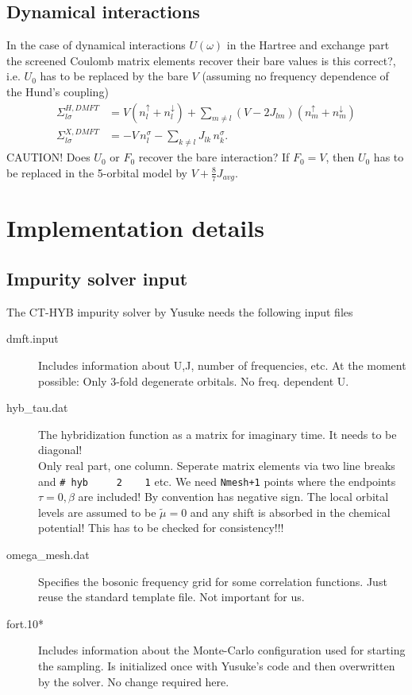 \documentclass[12pt,a4paper]{scrartcl}
\numberwithin{equation}{section}
\newcommand{\cng}[1]{{\color{red}#1}}
\begin{document}
\subsection{Dynamical interactions}
In the case of dynamical interactions $U(\omega)$ in the Hartree and exchange part
the screened Coulomb matrix elements recover their bare values \cng{is this correct?}, i.e.
$U_0$ has to be replaced by the bare $V$ (assuming no frequency dependence of the 
Hund's coupling)
\begin{align}
\Sigma^{H,DMFT}_{l\sigma}
&= V (n^{\uparrow}_l + n^{\downarrow}_l)
               + \sum_{m\neq l} (V-2J_{lm}) (n^{\uparrow}_m + n^{\downarrow}_m) 
\label{eq:hartree_selfenergy_freq} \\
%
\Sigma^{X,DMFT}_{l\sigma}
&= - V\, n^{\sigma}_l -  \sum_{k\neq l} J_{lk} \, n^{\sigma}_{k}.               
\end{align}
\cng{CAUTION!} Does $U_0$ or $F_0$ recover the bare interaction? If $F_0=V$,
then $U_0$ has to be replaced in the 5-orbital model by $V + \frac{8}{7}J_{avg}$.


\section{Implementation details}

\subsection{Impurity solver input}

The CT-HYB impurity solver by Yusuke needs the following input files
\begin{description}
\item[dmft.input] Includes information about U,J, number of frequencies, etc. At the moment
possible: Only 3-fold degenerate orbitals. No freq. dependent U.

\item[hyb\_tau.dat] The hybridization function as a matrix for imaginary time. 
It needs to be diagonal! \\
Only real part, one column. Seperate matrix elements
via two line breaks and \verb|# hyb     2    1| etc. We need \verb|Nmesh+1|
points where the endpoints $\tau=0,\beta$ are included! By convention has negative sign.
\cng{The local orbital levels are assumed to be $\tilde{\mu}=0$ and any
shift is absorbed in the chemical potential! This has to 
be checked for consistency!!!}

\item[omega\_mesh.dat] Specifies the bosonic frequency grid for some 
correlation functions. Just reuse the standard template file. Not important for us.

\item[fort.10*] Includes information about the Monte-Carlo configuration used
for starting the sampling. Is initialized once with Yusuke's code and then overwritten by 
the solver. No change required here.
\end{description}
\end{document}
